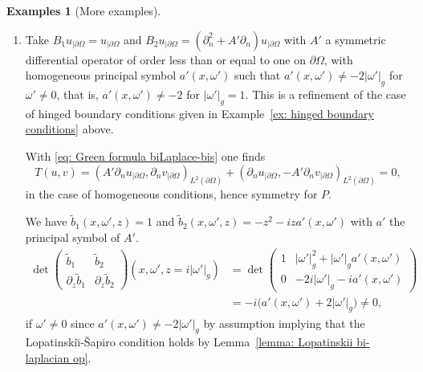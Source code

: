 \documentclass[JEP,XML,SOM,Unicode,published]{cedram}
\theoremstyle{plain}
\theoremstyle{definition}
\newtheorem{examples}[theorem]{Examples}
\newcommand{\LS}{Lopatinski\u{\i}-\v{S}apiro\xspace}
\newcommand{\inp}[2]{(#1, #2)}
\newcommand{\bd}{\ensuremath{_{|\partial\Omega}}}
\begin{document}
\begin{examples}[More examples]
\begin{enumerate}
We have $\tilde{b}_1(x,\omega',z)=-i z$ and
$\tilde{b}_2(x,\omega',z)=iz^3 + a'(x,\omega')$ with $a'$ the
principal symbol of $A'$.
\begin{align*}
\det
\begin{pmatrix}
\tilde{b}_1 &\tilde{b}_2 \\[
2pt]
\partial_z\tilde{b}_1& \partial_z\tilde{b}_2
\end{pmatrix} (x,\omega',z=i|\omega'|_g)
&=
\det
\begin{pmatrix}
|\omega'|_g &|\omega'|^3_g + a'(x,\omega')\\[
2pt]
- i &-3i|\omega'|^2_g
\end{pmatrix} \\
&= i \big(a'(x,\omega') -2 |\omega'|^3_g\big)\neq 0,
\end{align*}
if $\omega'\neq 0$ since $a'(x,\omega') \neq 2 |\omega'|^3_g$ by
assumption implying
that the \LS condition holds by Lemma~\ref{lemma: Lopatinskii bi-laplacian op}.

\item
Take $B_1 u\bd =u\bd$ and $B_2 u\bd
=(\partial_n^2+ A' \partial_n) u\bd$ with $A'$ a symmetric differential
operator of order less than or equal to one on
$\partial \Omega$, with homogeneous principal symbol $a'(x,\omega')$ such that
$a'(x,\omega') \neq - 2 |\omega'|_g$ for $\omega' \neq 0$, that
is, $a'(x,\omega')\neq -2$ for $|\omega'|_g=1$.
This is a refinement of the case of hinged boundary conditions given
in Example~\ref{ex: hinged boundary conditions} above.

With \eqref{eq: Green formula biLaplace-bis} one
finds
\begin{equation*}
T(u,v)
= \inp{A' \partial_n u\bd}{\partial_n v\bd}_{L^2(\partial\Omega)}
+ \inp{\partial_n u\bd}{- A' \partial_n v\bd}_{L^2(\partial\Omega)}
=0,
\end{equation*}
in the case of homogeneous conditions, hence symmetry for $P$.

We have $\tilde{b}_1(x,\omega',z)=1$ and
$\tilde{b}_2(x,\omega',z)=-z^2 -i z a'(x,\omega')$ with $a'$ the
principal symbol of $A'$.
\begin{align*}
\det
\begin{pmatrix}
\tilde{b}_1 &\tilde{b}_2 \\[
2pt]
\partial_z\tilde{b}_1& \partial_z\tilde{b}_2
\end{pmatrix} (x,\omega',z=i|\omega'|_g)
&=
\det
\begin{pmatrix}
1&|\omega'|^2_g + |\omega'|_g a'(x,\omega')\\[
2pt]
0 &-2i|\omega'|_g - i a'(x,\omega')
\end{pmatrix} \\
&= - i \big(a'(x,\omega') + 2 |\omega'|_g\big)\neq 0,
\end{align*}
if $\omega'\neq 0$ since $a'(x,\omega') \neq - 2 |\omega'|_g$ by
assumption implying
that the \LS condition holds by Lemma~\ref{lemma: Lopatinskii bi-laplacian op}.


\end{enumerate}
\end{examples}
\end{document}
